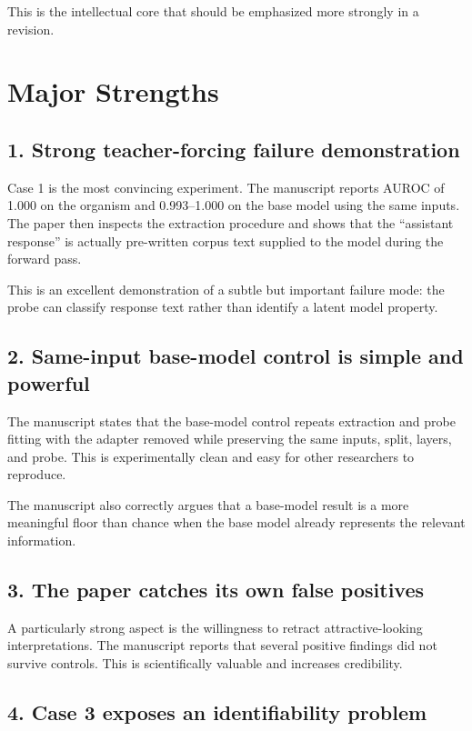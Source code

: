 \documentclass[11pt,a4paper]{article}
\begin{document}
This is the intellectual core that should be emphasized more strongly in a revision.

\section{Major Strengths}

\subsection{1. Strong teacher-forcing failure demonstration}

Case 1 is the most convincing experiment. The manuscript reports AUROC of 1.000 on the organism and 0.993--1.000 on the base model using the same inputs. The paper then inspects the extraction procedure and shows that the ``assistant response'' is actually pre-written corpus text supplied to the model during the forward pass.

This is an excellent demonstration of a subtle but important failure mode: the probe can classify response text rather than identify a latent model property.

\subsection{2. Same-input base-model control is simple and powerful}

The manuscript states that the base-model control repeats extraction and probe fitting with the adapter removed while preserving the same inputs, split, layers, and probe. This is experimentally clean and easy for other researchers to reproduce.

The manuscript also correctly argues that a base-model result is a more meaningful floor than chance when the base model already represents the relevant information.

\subsection{3. The paper catches its own false positives}

A particularly strong aspect is the willingness to retract attractive-looking interpretations. The manuscript reports that several positive findings did not survive controls. This is scientifically valuable and increases credibility.

\subsection{4. Case 3 exposes an identifiability problem}
\end{document}
